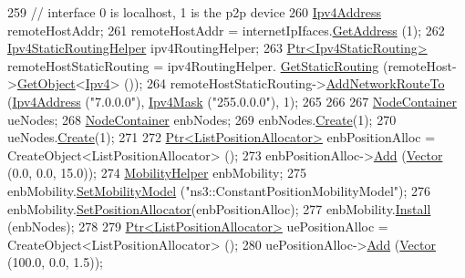 \begin{DoxyCode}
259         \textcolor{comment}{// interface 0 is localhost, 1 is the p2p device}
260         \hyperlink{classns3_1_1Ipv4Address}{Ipv4Address} remoteHostAddr;
261         remoteHostAddr = internetIpIfaces.\hyperlink{classns3_1_1Ipv4InterfaceContainer_ae63208dcd222be986822937ee4aa828c}{GetAddress} (1);
262         \hyperlink{classns3_1_1Ipv4StaticRoutingHelper}{Ipv4StaticRoutingHelper} ipv4RoutingHelper;
263         \hyperlink{classns3_1_1Ptr}{Ptr<Ipv4StaticRouting>} remoteHostStaticRouting = ipv4RoutingHelper.
      \hyperlink{classns3_1_1Ipv4StaticRoutingHelper_a731206e50d305695dac7fb2ef963a4bb}{GetStaticRouting} (remoteHost->\hyperlink{classns3_1_1Object_a13e18c00017096c8381eb651d5bd0783}{GetObject}<\hyperlink{classns3_1_1Ipv4}{Ipv4}> ());
264         remoteHostStaticRouting->\hyperlink{classns3_1_1Ipv4StaticRouting_a8bf5eaa7ba49fe33c78c70d5560b6c39}{AddNetworkRouteTo} (\hyperlink{classns3_1_1Ipv4Address}{Ipv4Address} (\textcolor{stringliteral}{"7.0.0.0"}), 
      \hyperlink{classns3_1_1Ipv4Mask}{Ipv4Mask} (\textcolor{stringliteral}{"255.0.0.0"}), 1);
265 
266 
267         \hyperlink{classns3_1_1NodeContainer}{NodeContainer} ueNodes;
268         \hyperlink{classns3_1_1NodeContainer}{NodeContainer} enbNodes;
269         enbNodes.\hyperlink{classns3_1_1NodeContainer_a787f059e2813e8b951cc6914d11dfe69}{Create}(1);
270         ueNodes.\hyperlink{classns3_1_1NodeContainer_a787f059e2813e8b951cc6914d11dfe69}{Create}(1);
271 
272         \hyperlink{classns3_1_1Ptr}{Ptr<ListPositionAllocator>} enbPositionAlloc = 
      CreateObject<ListPositionAllocator> ();
273         enbPositionAlloc->\hyperlink{classns3_1_1ListPositionAllocator_a460e82f015ac012a73ba0ea0cccb3486}{Add} (\hyperlink{classns3_1_1Vector3D_a7e59b47bc94c9cb1dadff68c1d0112d8}{Vector} (0.0, 0.0, 15.0));
274         \hyperlink{classns3_1_1MobilityHelper}{MobilityHelper} enbMobility;
275         enbMobility.\hyperlink{classns3_1_1MobilityHelper_a030275011b6f40682e70534d30280aba}{SetMobilityModel} (\textcolor{stringliteral}{"ns3::ConstantPositionMobilityModel"});
276         enbMobility.\hyperlink{classns3_1_1MobilityHelper_ac59d5295076be3cc11021566713a28c5}{SetPositionAllocator}(enbPositionAlloc);
277         enbMobility.\hyperlink{classns3_1_1MobilityHelper_a07737960ee95c0777109cf2994dd97ae}{Install} (enbNodes);
278 
279         \hyperlink{classns3_1_1Ptr}{Ptr<ListPositionAllocator>} uePositionAlloc = 
      CreateObject<ListPositionAllocator> ();
280         uePositionAlloc->\hyperlink{classns3_1_1ListPositionAllocator_a460e82f015ac012a73ba0ea0cccb3486}{Add} (\hyperlink{classns3_1_1Vector3D_a7e59b47bc94c9cb1dadff68c1d0112d8}{Vector} (100.0, 0.0, 1.5));

\end{DoxyCode}
